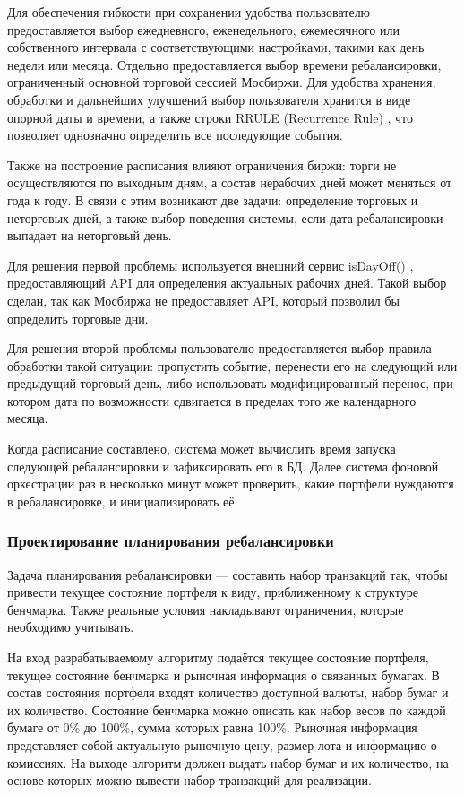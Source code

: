 \documentclass[14pt]{gost-7-32}
\begin{document}
Для обеспечения гибкости при сохранении удобства пользователю предоставляется выбор ежедневного, еженедельного, ежемесячного или собственного интервала с соответствующими настройками, такими как день недели или месяца. Отдельно предоставляется выбор времени ребалансировки, ограниченный основной торговой сессией Мосбиржи. Для удобства хранения, обработки и дальнейших улучшений выбор пользователя хранится в виде опорной даты и времени, а также строки RRULE (Recurrence Rule) \cite{rfc5545iCalendar}, что позволяет однозначно определить все последующие события.

Также на построение расписания влияют ограничения биржи: торги не осуществляются по выходным дням, а состав нерабочих дней может меняться от года к году. В связи с этим возникают две задачи: определение торговых и неторговых дней, а также выбор поведения системы, если дата ребалансировки выпадает на неторговый день.

Для решения первой проблемы используется внешний сервис isDayOff() \cite{isdayoffApi}, предоставляющий API для определения актуальных рабочих дней. Такой выбор сделан, так как Мосбиржа не предоставляет API, который позволил бы определить торговые дни.

Для решения второй проблемы пользователю предоставляется выбор правила обработки такой ситуации: пропустить событие, перенести его на следующий или предыдущий торговый день, либо использовать модифицированный перенос, при котором дата по возможности сдвигается в пределах того же календарного месяца.

Когда расписание составлено, система может вычислить время запуска следующей ребалансировки и зафиксировать его в БД. Далее система фоновой оркестрации раз в несколько минут может проверить, какие портфели нуждаются в ребалансировке, и инициализировать её.

\subsubsection{Проектирование планирования ребалансировки}
\label{sec:design-rebalance-planning}

Задача планирования ребалансировки --- составить набор транзакций так, чтобы привести текущее состояние портфеля к виду, приближенному к структуре бенчмарка. Также реальные условия накладывают ограничения, которые необходимо учитывать.

На вход разрабатываемому алгоритму подаётся текущее состояние портфеля, текущее состояние бенчмарка и рыночная информация о связанных бумагах. В состав состояния портфеля входят количество доступной валюты, набор бумаг и их количество. Состояние бенчмарка можно описать как набор весов по каждой бумаге от 0\% до 100\%, сумма которых равна 100\%. Рыночная информация представляет собой актуальную рыночную цену, размер лота и информацию о комиссиях. На выходе алгоритм должен выдать набор бумаг и их количество, на основе которых можно вывести набор транзакций для реализации.
\end{document}
